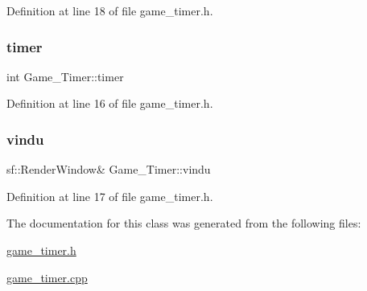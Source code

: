 Definition at line 18 of file game\+\_\+timer.\+h.

\hypertarget{class_game___timer_a3d5fd5c7113df6f8a4a71130b74716c1}{}\label{class_game___timer_a3d5fd5c7113df6f8a4a71130b74716c1} 
\subsubsection{\texorpdfstring{timer}{timer}}
{\footnotesize\ttfamily int Game\+\_\+\+Timer\+::timer\hspace{0.3cm}{\ttfamily [protected]}}



Definition at line 16 of file game\+\_\+timer.\+h.

\hypertarget{class_game___timer_a09409d0e504612058311ec08a7f890f3}{}\label{class_game___timer_a09409d0e504612058311ec08a7f890f3} 
\subsubsection{\texorpdfstring{vindu}{vindu}}
{\footnotesize\ttfamily sf\+::\+Render\+Window\& Game\+\_\+\+Timer\+::vindu\hspace{0.3cm}{\ttfamily [protected]}}



Definition at line 17 of file game\+\_\+timer.\+h.



The documentation for this class was generated from the following files\+:\begin{DoxyCompactItemize}
\item 
\hyperlink{game__timer_8h}{game\+\_\+timer.\+h}\item 
\hyperlink{game__timer_8cpp}{game\+\_\+timer.\+cpp}\end{DoxyCompactItemize}
